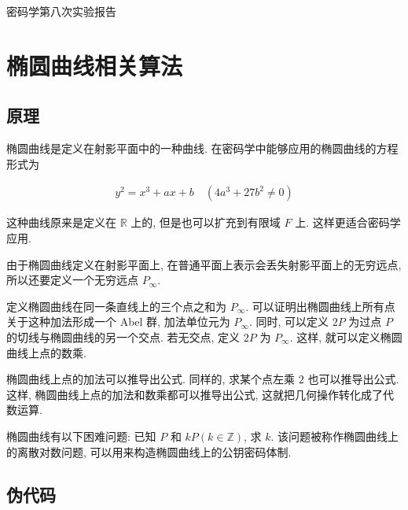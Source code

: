 \documentclass[12pt,a4paper]{article}
\begin{document}
{
\begin{center}
密码学第八次实验报告
\end{center}
}

\section*{椭圆曲线相关算法}

\subsection*{原理}

椭圆曲线是定义在射影平面中的一种曲线. 在密码学中能够应用的椭圆曲线的方程形式为

\begin{gather*}
y^2 = x^3 + ax + b \quad (4 a^3 + 27 b^2 \neq 0)
\end{gather*}

这种曲线原来是定义在 $ \mathbb{R} $ 上的, 但是也可以扩充到有限域 $ F $ 上. 这样更适合密码学应用. 

由于椭圆曲线定义在射影平面上, 在普通平面上表示会丢失射影平面上的无穷远点, 所以还要定义一个无穷远点 $ P_{\infty} $. 

定义椭圆曲线在同一条直线上的三个点之和为 $ P_{\infty} $. 可以证明出椭圆曲线上所有点关于这种加法形成一个 Abel 群, 加法单位元为 $ P_{\infty} $. 同时, 可以定义 $ 2P $ 为过点 $ P $ 的切线与椭圆曲线的另一个交点. 若无交点, 定义 $ 2P $ 为 $ P_{\infty} $. 这样, 就可以定义椭圆曲线上点的数乘. 

椭圆曲线上点的加法可以推导出公式. 同样的, 求某个点左乘 $ 2 $ 也可以推导出公式. 这样, 椭圆曲线上点的加法和数乘都可以推导出公式, 这就把几何操作转化成了代数运算. 

椭圆曲线有以下困难问题: 已知 $ P $ 和 $ kP (k \in \mathbb{Z} ) $, 求 $ k $. 该问题被称作椭圆曲线上的离散对数问题, 可以用来构造椭圆曲线上的公钥密码体制.

\subsection*{伪代码}

\end{document}

